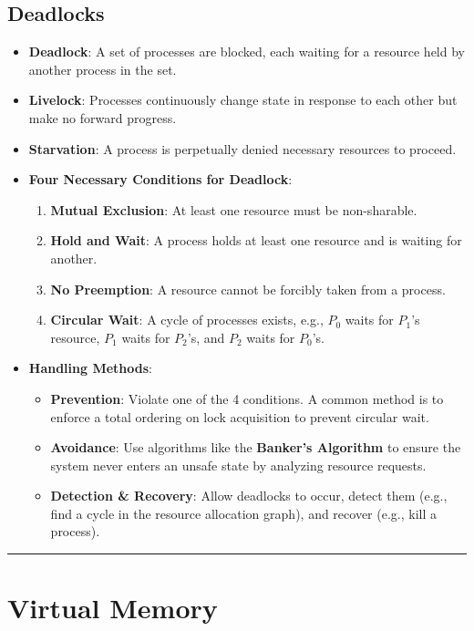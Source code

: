 \documentclass[8pt,a4paper]{article}
\newcommand{\sectiondivider}{\vspace{4pt}\hrule\vspace{4pt}}
\begin{document}
\begin{multicols}{2}
\subsection*{Deadlocks}
\begin{itemize}
    \item \textbf{Deadlock}: A set of processes are blocked, each waiting for a resource held by another process in the set.
    \item \textbf{Livelock}: Processes continuously change state in response to each other but make no forward progress.
    \item \textbf{Starvation}: A process is perpetually denied necessary resources to proceed.
    \item \textbf{Four Necessary Conditions for Deadlock}:
    \begin{enumerate}
        \item \textbf{Mutual Exclusion}: At least one resource must be non-sharable.
        \item \textbf{Hold and Wait}: A process holds at least one resource and is waiting for another.
        \item \textbf{No Preemption}: A resource cannot be forcibly taken from a process.
        \item \textbf{Circular Wait}: A cycle of processes exists, e.g., $P_0$ waits for $P_1$'s resource, $P_1$ waits for $P_2$'s, and $P_2$ waits for $P_0$'s.
    \end{enumerate}
    \item \textbf{Handling Methods}:
    \begin{itemize}
        \item \textbf{Prevention}: Violate one of the 4 conditions. A common method is to enforce a total ordering on lock acquisition to prevent circular wait.
        \item \textbf{Avoidance}: Use algorithms like the \textbf{Banker's Algorithm} to ensure the system never enters an unsafe state by analyzing resource requests.
        \item \textbf{Detection \& Recovery}: Allow deadlocks to occur, detect them (e.g., find a cycle in the resource allocation graph), and recover (e.g., kill a process).
    \end{itemize}
\end{itemize}

\sectiondivider
\section*{Virtual Memory}

\end{multicols}
\end{document}
